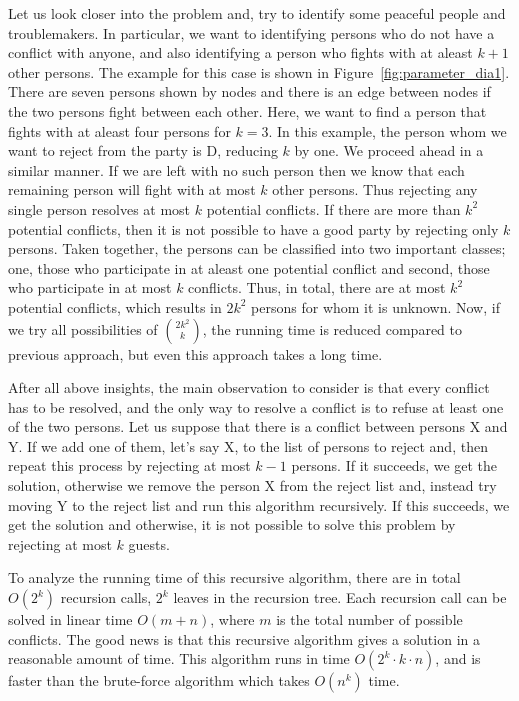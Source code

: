 Let us look closer into the problem and, try to identify some peaceful people and troublemakers.
In particular, we want to identifying persons who do not have a conflict with anyone, and also identifying a person who fights with at aleast $k+1$ other persons.
The example for this case is shown in Figure~\ref{fig:parameter_dia1}. 
There are seven persons shown by nodes and there is an edge between nodes if the two persons fight between each other.
Here, we want to find a person that fights with at aleast four persons for $k=3$. In this example, the person whom we want to reject from the party is D, reducing $k$ by one.
We proceed ahead in a similar manner. If we are left with no such person then we know that each remaining person will fight with at most $k$ other persons.
Thus rejecting any single person resolves at most $k$ potential conflicts.
If there are more than $k^2$ potential conflicts, then it is not possible to have a good party by rejecting only $k$ persons.
Taken together, the persons can be classified into two important classes; one, those who participate in at aleast one potential conflict and second, those who participate in at most $k$ conflicts. 
Thus, in total, there are at most $k^2$ potential conflicts, which results in $2k^2$ persons for whom it is unknown.
Now, if we try all possibilities of $2k^2 \choose k$, the running time is reduced compared to previous approach, but even this approach takes a long time.

After all above insights, the main observation to consider is that every conflict has to be resolved, and the only way to resolve a conflict is to refuse at least one of the two persons.
Let us suppose that there is a conflict between persons X and Y. 
If we add one of them, let's say X, to the list of persons to reject and, then repeat this process by rejecting at most $k-1$ persons.
If it succeeds, we get the solution, otherwise we remove the person X from the reject list and, instead try moving Y to the reject list and run this algorithm recursively.
If this succeeds, we get the solution and otherwise, it is not possible to solve this problem by rejecting at most $k$ guests.

To analyze the running time of this recursive algorithm, there are in total $O(2^k)$ recursion calls, $2^k$ leaves in the recursion tree.
Each recursion call can be solved in linear time $O(m+n)$, where $m$ is the total number of possible conflicts.
The good news is that this recursive algorithm gives a solution in a reasonable amount of time.
This algorithm runs in time $O(2^k \cdot k \cdot n)$, 
and is faster than the brute-force algorithm which takes $O(n^k)$ time.


